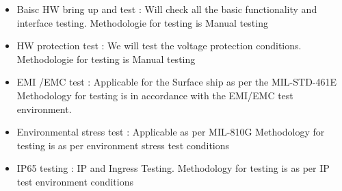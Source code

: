 \documentclass[a4paper,12pt]{article}
\begin{document}
	\begin{itemize}
		\item Baisc HW bring up and test :
		Will check all the basic functionality and interface testing. Methodologie for testing is Manual testing 
		\item HW protection test : 
		We will test the voltage protection conditions. Methodologie for testing is Manual testing 
		\item EMI /EMC test : 
		Applicable for the Surface ship as per the MIL-STD-461E Methodology for testing is in accordance with the EMI/EMC test environment.
		\item Environmental stress test :
		Applicable as per MIL-810G   Methodology for testing is as per environment stress test conditions
		\item IP65 testing : 
		IP and Ingress Testing. Methodology for testing is as per IP test environment conditions
		
		
	\end{itemize}
	
\end{document}
